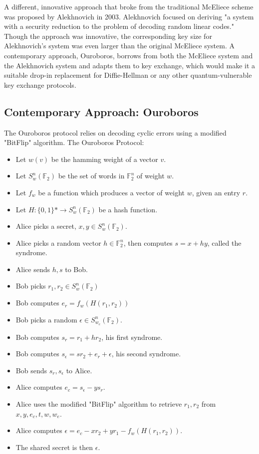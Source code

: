 \documentclass{article}
\begin{document}
A different, innovative approach that broke from the traditional McEliece scheme was proposed by Alekhnovich in 2003. Alekhnovich focused on deriving "a system with a security reduction to the problem of decoding random linear codes."\cite{alekhnovich03} Though the approach was innovative, the corresponding key size for Alekhnovich's system was even larger than the original McEliece system. A contemporary approach, Ouroboros, borrows from both the McEliece system and the Alekhnovich system and adapts them to key exchange, which would make it a suitable drop-in replacement for Diffie-Hellman or any other quantum-vulnerable key exchange protocols.\cite{deneuville17}

\subsection{Contemporary Approach: Ouroboros}

The Ouroboros protocol relies on decoding cyclic errors using a modified "BitFlip" algorithm. The Ouroboros Protocol:\cite{deneuville17}

\begin{itemize}
	\item Let $ w(v) $ be the hamming weight of a vector $ v $.
	\item Let $ S^n_w(\mathbb{F}_2) $ be the set of words in $ \mathbb{F}^n_2 $ of weight $ w $.
	\item Let $ f_w $ be a function which produces a vector of weight $ w $, given an entry $ r $.
	\item Let $ H: \{ 0, 1 \}* \rightarrow S^n_w(\mathbb{F}_2) $ be a hash function.
	\item Alice picks a secret, $ x, y \in S^n_w(\mathbb{F}_2) $.
	\item Alice picks a random vector $ h \in \mathbb{F}^n_2 $, then computes $ s = x + h y $, called the syndrome.
	\item Alice sends $ h, s $ to Bob.
	\item Bob picks $ r_1, r_2 \in S^n_w(\mathbb{F}_2) $
	\item Bob computes $ e_r = f_w (H(r_1, r_2)) $
	\item Bob picks a random $ \epsilon \in S^n_{w_e}(\mathbb{F}_2) $.
	\item Bob computes $ s_r = r_1 + h r_2 $, his first syndrome.
	\item Bob computes $ s_\epsilon = s r_2 + e_r + \epsilon $, his second syndrome.
	\item Bob sends $ s_r, s_\epsilon $ to Alice.
	\item Alice computes $ e_c = s_\epsilon - y s_r$.
	\item Alice uses the modified "BitFlip" algorithm to retrieve $ r_1, r_2 $ from $ x, y, e_c, t, w, w_e $.
	\item Alice computes $ \epsilon = e_c - x r_2 + y r_1 - f_w(H(r_1, r_2)) $.
	\item The shared secret is then $ \epsilon $.
\end{itemize}
\end{document}
